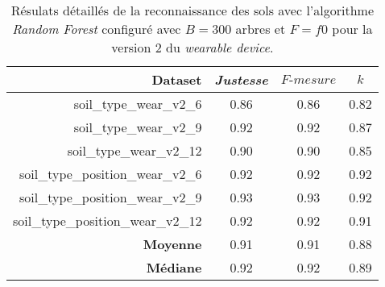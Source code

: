 \begin{table}[H]\renewcommand{\arraystretch}{0.5}
	\centering
	\caption{Résulats détaillés de la reconnaissance des sols avec l'algorithme \textit{Random Forest} configuré avec $B=300$ arbres et $F=f0$ pour la version 2 du \textit{wearable device}.}
	\label{tab:tab:rf-300-f0-wear-v2}
	\begin{tabular}{@{}rccc@{}}
		\toprule
			\textbf{Dataset} & \textit{Justesse} & $F\mbox{-} mesure$ & \textbf{$k$} \\
		\midrule
			soil\_type\_wear\_v2\_6 & 0.86 & 0.86 & 0.82 \\
			soil\_type\_wear\_v2\_9 & 0.92 & 0.92 & 0.87 \\
			soil\_type\_wear\_v2\_12 & 0.90 & 0.90 & 0.85 \\
			soil\_type\_position\_wear\_v2\_6 & 0.92 & 0.92 & 0.92 \\
			soil\_type\_position\_wear\_v2\_9 & 0.93 & 0.93 & 0.92 \\
			soil\_type\_position\_wear\_v2\_12 & 0.92 & 0.92 & 0.91 \\
			\textbf{Moyenne} & 0.91 & 0.91 & 0.88 \\
			\textbf{Médiane} & 0.92 & 0.92 & 0.89 \\
		\bottomrule
	\end{tabular}
\end{table}

